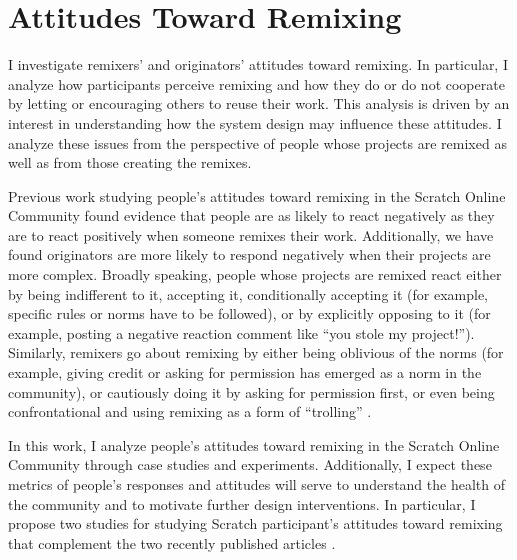 \chapter{Attitudes Toward Remixing}

I investigate remixers' and originators' attitudes toward remixing. In particular, I analyze how participants perceive remixing and how they do or do not cooperate by letting or encouraging others to reuse their work.
This analysis is driven by an interest in understanding how the system design may influence these attitudes. 
I analyze these issues from the perspective of people whose projects are remixed as well as from those creating the remixes.
 
Previous work studying people's attitudes toward remixing in the Scratch Online Community \citep{hill_responses_2010, monroy-hernandez_computers_2011} found evidence that people are as likely to react negatively as they are to react positively when someone remixes their work. 
Additionally, we have found originators are more likely to respond negatively when their projects are more complex.
Broadly speaking, people whose projects are remixed react either by being indifferent to it, accepting it, conditionally accepting it (for example, specific rules or norms have to be followed), or by explicitly opposing to it (for example, posting a negative reaction comment like ``you stole my project!'').
Similarly, remixers go about remixing by either being oblivious of the norms (for example, giving credit or asking for permission has emerged as a norm in the  community), or cautiously doing it by asking for permission first, or even being confrontational and using remixing as a form of ``trolling'' \citep{donath_identity_1998}.

In this work, I analyze people's attitudes toward remixing in the Scratch Online Community through case studies and experiments.
Additionally, I expect these metrics of people's responses and attitudes will serve to understand the health of the community and to motivate further design interventions.
In particular, I propose two studies for studying Scratch participant's attitudes toward remixing that complement the two recently published articles \citep{monroy-hernandez_computers_2011,hill_responses_2010}.


